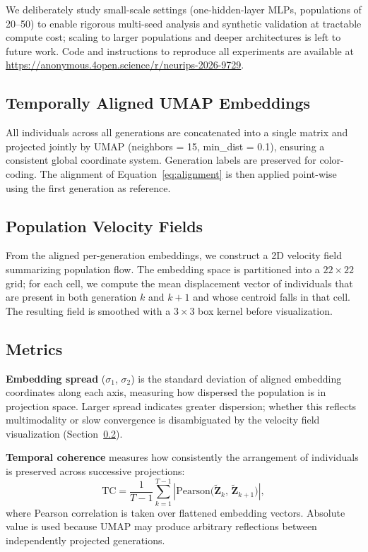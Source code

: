 \documentclass{article}
\begin{document}
We deliberately study small-scale settings (one-hidden-layer MLPs,
populations of 20--50) to enable rigorous multi-seed analysis and
synthetic validation at tractable compute cost; scaling to larger
populations and deeper architectures is left to future work.
Code and instructions to reproduce all experiments are available at
\url{https://anonymous.4open.science/r/neurips-2026-9729}.

\subsection{Temporally Aligned UMAP Embeddings}

All individuals across all generations are concatenated into a single
matrix and projected jointly by UMAP (neighbors = 15, min\_dist = 0.1),
ensuring a consistent global coordinate system. Generation labels are
preserved for color-coding. The alignment of Equation~\ref{eq:alignment}
is then applied point-wise using the first generation as reference.

\subsection{Population Velocity Fields}
\label{sec:velocity}

From the aligned per-generation embeddings, we construct a 2D velocity
field summarizing population flow. The embedding space is partitioned
into a $22 \times 22$ grid; for each cell, we compute the mean
displacement vector of individuals that are present in both generation
$k$ and $k+1$ and whose centroid falls in that cell. The resulting
field is smoothed with a $3 \times 3$ box kernel before visualization.

\subsection{Metrics}

\textbf{Embedding spread} ($\sigma_1$, $\sigma_2$) is the standard
deviation of aligned embedding coordinates along each axis, measuring
how dispersed the population is in projection space. Larger spread
indicates greater dispersion; whether this reflects multimodality or
slow convergence is disambiguated by the velocity field visualization
(Section~\ref{sec:velocity}).

\textbf{Temporal coherence} measures how consistently the arrangement
of individuals is preserved across successive projections:
\begin{equation}
  \mathrm{TC} = \frac{1}{T-1} \sum_{k=1}^{T-1}
  \left| \mathrm{Pearson}\bigl(\tilde{\mathbf{Z}}_k,\,\tilde{\mathbf{Z}}_{k+1}\bigr) \right|,
\end{equation}
where Pearson correlation is taken over flattened embedding vectors.
Absolute value is used because UMAP may produce arbitrary
reflections between independently projected generations.
\end{document}

